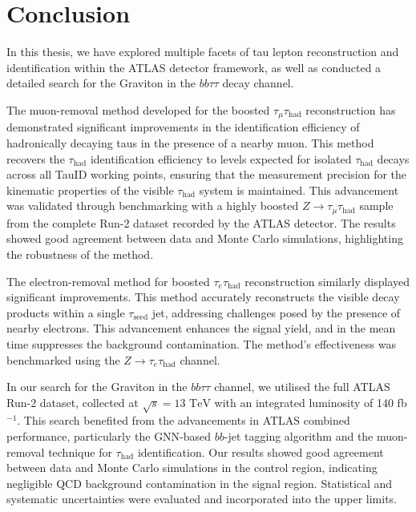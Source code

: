 \chapter{Conclusion}

\graphicspath{{18Chap8_Concl/Figs/}}

In this thesis, we have explored multiple facets of tau lepton reconstruction and identification within the ATLAS detector 
framework, as well as conducted a detailed search for the Graviton in the \(bb\tau\tau\) decay channel. 

The muon-removal method developed for the boosted \(\tau_\mu\tau_{\text{had}}\) reconstruction has demonstrated significant 
improvements in the identification efficiency of hadronically decaying taus in the presence of a nearby muon. This method 
recovers the \(\tau_{\text{had}}\) identification efficiency to levels expected for isolated \(\tau_{\text{had}}\) decays 
across all TauID working points, ensuring that the measurement precision for the kinematic properties of the visible 
\(\tau_{\text{had}}\) system is maintained. This advancement was validated through benchmarking with a highly boosted 
\(Z \rightarrow \tau_\mu\tau_{\text{had}}\) sample from the complete Run-2 dataset recorded by the ATLAS detector. The 
results showed good agreement between data and Monte Carlo simulations, highlighting the robustness of the method.

The electron-removal method for boosted \(\tau_e\tau_{\text{had}}\) reconstruction similarly displayed significant improvements. 
This method accurately reconstructs the visible decay products within a single \(\tau_{\text{seed}}\) jet, addressing challenges 
posed by the presence of nearby electrons. This advancement enhances the signal yield, and in the mean time suppresses the background contamination. 
The method's effectiveness was benchmarked using the \(Z \rightarrow \tau_e\tau_{\text{had}}\) 
channel.

In our search for the Graviton in the \(bb\tau\tau\) channel, we utilised the full ATLAS Run-2 dataset, collected at 
\(\sqrt{s} = 13 \text{ TeV}\) with an integrated luminosity of 140 fb\(^{-1}\). This search benefited from the 
advancements in ATLAS combined performance, particularly the GNN-based \(bb\)-jet tagging algorithm and the muon-removal 
technique for \(\tau_{\text{had}}\) identification. Our results showed good agreement between data 
and Monte Carlo simulations in the control region, indicating negligible QCD background contamination in the signal 
region. Statistical and systematic uncertainties were evaluated and incorporated into the upper limits.

